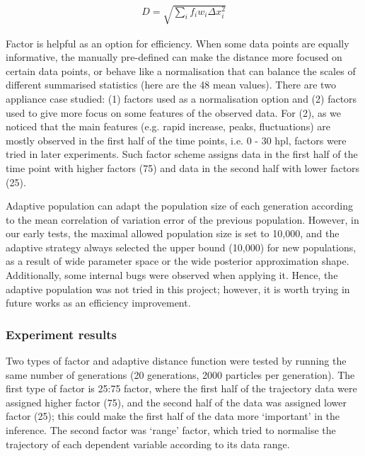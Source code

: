 \begin{align}
    \label{dis_f}
    D=\sqrt{\sum_i f_iw_i \Delta x_i^2}
\end{align}

Factor is helpful as an option for efficiency. When some data points are equally informative, the manually pre-defined can make the distance more focused on certain data points, or behave like a normalisation that can balance the scales of different summarised statistics (here are the 48 mean values). There are two appliance case studied: (1) factors used as a normalisation option and (2) factors used to give more focus on some features of the observed data. For (2), as we noticed that the main features (e.g. rapid increase, peaks, fluctuations) are mostly observed in the first half of the time points, i.e. 0 - 30 hpl, factors were tried in later experiments. Such factor scheme assigns data in the first half of the time point with higher factors (75) and data in the second half with lower factors (25).

Adaptive population \cite{population} can adapt the population size of each generation according to the mean correlation of variation error of the previous population. However, in our early tests,  the maximal allowed population size is set to 10,000, and the adaptive strategy always selected the upper bound (10,000) for new populations, as a result of wide parameter space or the wide posterior approximation shape. Additionally, some internal bugs were observed when applying it. Hence, the adaptive population was not tried in this project; however, it is worth trying in future works as an efficiency improvement.



\subsubsection{Experiment results}


Two types of factor and adaptive distance function were tested by running the same number of generations (20 generations, 2000 particles per generation). The first type of factor is 25:75  factor, where the first half of the trajectory data were assigned higher factor (75), and the second half of the data was assigned lower factor (25); this could make the first half of the data more `important' in the inference. The second factor was `range' factor, which tried to normalise the trajectory of each dependent variable according to its data range.

